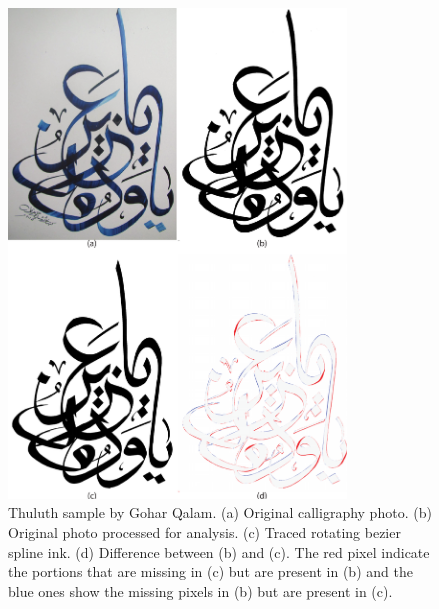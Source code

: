 {\begin{figure}[H]
  \centering
  \includegraphics[width=0.8\textwidth]{Thuluth_Ink.pdf}
  \caption
  {
      Thuluth sample by Gohar Qalam. (a) Original calligraphy photo. (b) Original photo processed for analysis. (c) Traced rotating bezier spline ink. (d) Difference between (b) and (c). The red pixel indicate the portions that are missing in (c) but are present in (b) and the blue ones show the missing pixels in (b) but are present in (c).
  }
\end{figure}

}
